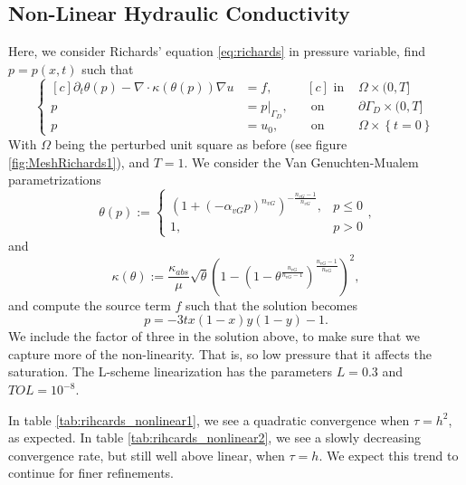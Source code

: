 \documentclass[../Main/main.tex]{subfiles}
\begin{document}
	\subsection{Non-Linear Hydraulic Conductivity}
	Here, we consider Richards' equation \eqref{eq:richards} in pressure variable, find $p=p(x,t)$ such that
	\begin{equation}
	\left \{
	\begin{aligned}[c]
		\partial_t \theta(p) - \nabla \cdot \kappa(\theta(p))\nabla u &= f, \\
		p &= p|_{\Gamma_D}, \\
		p &= u_0,
	\end{aligned}
	\ \ \
	\begin{aligned}[c]
		\text{ in }& \Omega \times (0,T]\\
		\text{ on }& \partial \Gamma_D \times (0,T]\\
		\text{ on }& \Omega \times \left\{t=0\right \}
	\end{aligned}
	\right.
	\end{equation}
	With $\Omega$ being the perturbed unit square as before (see figure \ref{fig:MeshRichards1}), and $T=1$. We consider the Van Genuchten-Mualem parametrizations
	\begin{equation}\label{eq:van_1}
			\theta(p):=\left\{\begin{matrix}
				(1+(-\alpha_{vG}p)^{n_{vG}})^{-\frac{n_{vG}-1}{n_{vG}}},&p\leq 0 \\ 
				1,&p>0 
			\end{matrix}\right.,
	\end{equation}
and
\begin{equation}\label{eq:van_2}
	\kappa(\theta):=
		\frac{\kappa_{abs}}{\mu}\sqrt{\theta}\left(1-\left(1-\theta^{\frac{n_{vG}}{n_{vG}-1}}\right)^{\frac{n_{vG}-1}{n_{vG}}}\right)^2,
\end{equation}
	and compute the source term $f$ such that the solution becomes
	\begin{equation}
		p = -3tx(1-x)y(1-y)-1.
	\end{equation}
	We include the factor of three in the solution above, to make sure that we capture more of the non-linearity. That is, so low pressure that it affects the saturation. The L-scheme linearization has the parameters $L=0.3$ and $TOL=10^{-8}$.
	\par 
	In table \ref{tab:rihcards_nonlinear1}, we see a quadratic convergence when $\tau = h^2$, as expected. In table \ref{tab:rihcards_nonlinear2}, we see a slowly decreasing convergence rate, but still well above linear, when $\tau=h$. We expect this trend to continue for finer refinements.
\end{document}
